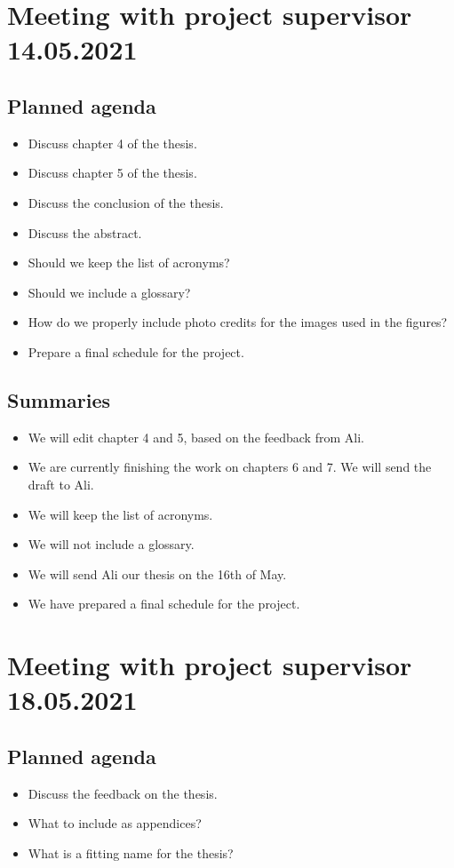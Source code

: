 \section*{Meeting with project supervisor 14.05.2021}

\subsection*{Planned agenda}
\begin{itemize}
    \item Discuss chapter 4 of the thesis.
    \item Discuss chapter 5 of the thesis.
    \item Discuss the conclusion of the thesis.
    \item Discuss the abstract.
    \item Should we keep the list of acronyms?
    \item Should we include a glossary?
    \item How do we properly include photo credits for the images used in the figures?
    \item Prepare a final schedule for the project.
\end{itemize}

\subsection*{Summaries}
\begin{itemize}
    \item We will edit chapter 4 and 5, based on the feedback from Ali.
    \item We are currently finishing the work on chapters 6 and 7. We will send the draft to Ali.
    \item We will keep the list of acronyms.
    \item We will not include a glossary.
    \item We will send Ali our thesis on the 16th of May.
    \item We have prepared a final schedule for the project.
\end{itemize}


\section*{Meeting with project supervisor 18.05.2021}
\subsection*{Planned agenda}
\begin{itemize}
    \item Discuss the feedback on the thesis.
    \item What to include as appendices?
    \item What is a fitting name for the thesis?
\end{itemize}

